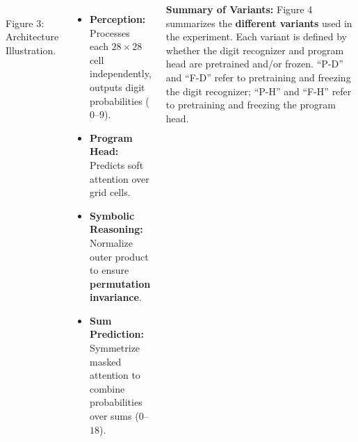 \documentclass[25pt, a0paper, portrait]{tikzposter}
\begin{document}
\begin{columns}
{    \begin{minipage}[h]{0.45\linewidth}
        \centering
        \scalebox{.85}{
            
        }
        \\
        Figure 3: Architecture Illustration. 
    \end{minipage}%
    \begin{minipage}[h]{0.51\linewidth}
        \centering
        \begin{itemize}
            \item \textbf{Perception:} Processes each $28 \times 28$ cell independently, outputs digit probabilities ($0$--$9$).
            \item \textbf{Program Head:} Predicts soft attention over grid cells.
            \item \textbf{Symbolic Reasoning:} Normalize outer product to ensure \textbf{permutation invariance}.
            \item \textbf{Sum Prediction:} Symmetrize masked attention to combine probabilities over sums ($0$--$18$).
        \end{itemize}
    \end{minipage}%


    \vspace{0.5cm}

    \begin{minipage}[h]{0.43\linewidth}

        \textbf{Summary of Variants:} Figure 4 summarizes the \textbf{different
        variants} used in the experiment. Each variant is defined by whether the
        digit recognizer and program head are pretrained and/or frozen. ``P-D''
        and ``F-D'' refer to pretraining and freezing the digit recognizer;
        ``P-H'' and ``F-H'' refer to pretraining and freezing the program head.


\end{minipage}}
\end{columns}
\end{document}
